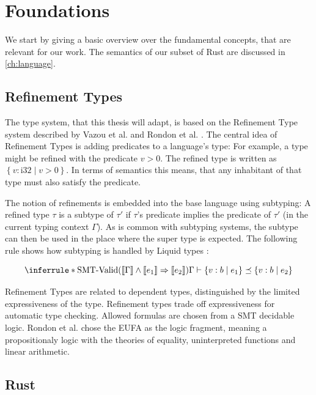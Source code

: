 \documentclass[twoside, english]{sdqthesis}
\theoremstyle{definition}
\begin{document}
\chapter{Foundations} \label{ch:foundations}

We start by giving a basic overview over the fundamental concepts, that are relevant for our work.
The semantics of our subset of Rust are discussed in \cref{ch:language}.

\section{Refinement Types}

The type system, that this thesis will adapt, is based on the Refinement Type system described by Vazou et al. \cite{vazou_abstract_2013} and Rondon et al. \cite{rondon_liquid_2008}. 
The central idea of Refinement Types is adding predicates to a language's type: For example, a type  might be refined with the predicate $v > 0$. The refined type is written as $\left\{ v : \text{i32} \mid v > 0 \right\}$. In terms of semantics this means, that any inhabitant of that type must also satisfy the predicate. 

The notion of refinements is embedded into the base language using subtyping: A refined type $\tau$ is a subtype of $\tau'$ if $\tau$'s predicate implies the predicate of $\tau'$ (in the current typing context $\Gamma$).
As is common with subtyping systems, the subtype can then be used in the place where the super type is expected.
The following rule shows how subtyping is handled by Liquid types \cite[p. 6]{rondon_liquid_2008}:

\begin{equation*}
  \inferrule*
    {\text{SMT-Valid}(\llbracket \Gamma \rrbracket \wedge \llbracket e_1 \rrbracket \Rightarrow \llbracket e_2 \rrbracket)}
    {\Gamma \vdash \left\{ v : b \mid e_1 \right\} \preceq \left\{ v: b \mid e_2 \right\}}
\end{equation*}

Refinement Types are related to dependent types, distinguished by the limited expressiveness of the type. Refinement types trade off expressiveness for automatic type checking. Allowed formulas are chosen from a SMT decidable logic. 
Rondon et al. \cite{rondon_liquid_2008} chose the EUFA as the logic fragment, meaning a propositionaly logic with the theories of equality, uninterpreted functions and linear arithmetic.


\section{Rust}
\end{document}
